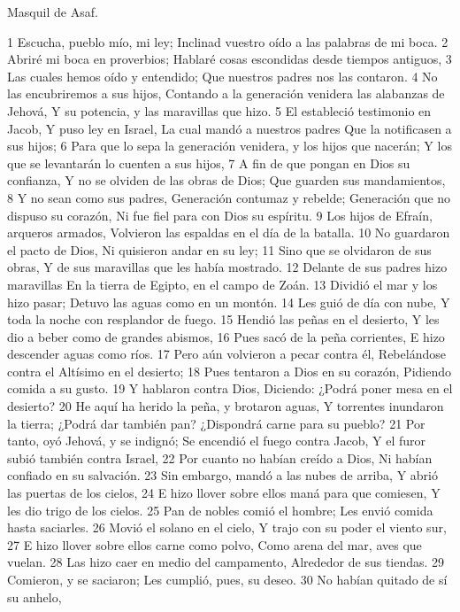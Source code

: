 Masquil de Asaf.

1 Escucha, pueblo mío, mi ley;
Inclinad vuestro oído a las palabras de mi boca.
2 Abriré mi boca en proverbios;
Hablaré cosas escondidas desde tiempos antiguos,
3 Las cuales hemos oído y entendido;
Que nuestros padres nos las contaron.
4 No las encubriremos a sus hijos,
Contando a la generación venidera las alabanzas de Jehová,
Y su potencia, y las maravillas que hizo.
5 El estableció testimonio en Jacob,
Y puso ley en Israel,
La cual mandó a nuestros padres
Que la notificasen a sus hijos;
6 Para que lo sepa la generación venidera, y los hijos que nacerán;
Y los que se levantarán lo cuenten a sus hijos,
7 A fin de que pongan en Dios su confianza,
Y no se olviden de las obras de Dios;
Que guarden sus mandamientos,
8 Y no sean como sus padres,
Generación contumaz y rebelde;
Generación que no dispuso su corazón,
Ni fue fiel para con Dios su espíritu.
9 Los hijos de Efraín, arqueros armados,
Volvieron las espaldas en el día de la batalla.
10 No guardaron el pacto de Dios,
Ni quisieron andar en su ley;
11 Sino que se olvidaron de sus obras,
Y de sus maravillas que les había mostrado.
12 Delante de sus padres hizo maravillas
En la tierra de Egipto, en el campo de Zoán.
13 Dividió el mar y los hizo pasar;
Detuvo las aguas como en un montón.
14 Les guió de día con nube,
Y toda la noche con resplandor de fuego.
15 Hendió las peñas en el desierto,
Y les dio a beber como de grandes abismos,
16 Pues sacó de la peña corrientes,
E hizo descender aguas como ríos.
17 Pero aún volvieron a pecar contra él,
Rebelándose contra el Altísimo en el desierto;
18 Pues tentaron a Dios en su corazón,
Pidiendo comida a su gusto.
19 Y hablaron contra Dios,
Diciendo: ¿Podrá poner mesa en el desierto?
20 He aquí ha herido la peña, y brotaron aguas,
Y torrentes inundaron la tierra;
¿Podrá dar también pan?
¿Dispondrá carne para su pueblo?
21 Por tanto, oyó Jehová, y se indignó;
Se encendió el fuego contra Jacob,
Y el furor subió también contra Israel,
22 Por cuanto no habían creído a Dios,
Ni habían confiado en su salvación.
23 Sin embargo, mandó a las nubes de arriba,
Y abrió las puertas de los cielos,
24 E hizo llover sobre ellos maná para que comiesen,
Y les dio trigo de los cielos.
25 Pan de nobles comió el hombre;
Les envió comida hasta saciarles.
26 Movió el solano en el cielo,
Y trajo con su poder el viento sur,
27 E hizo llover sobre ellos carne como polvo,
Como arena del mar, aves que vuelan.
28 Las hizo caer en medio del campamento,
Alrededor de sus tiendas.
29 Comieron, y se saciaron;
Les cumplió, pues, su deseo.
30 No habían quitado de sí su anhelo,

